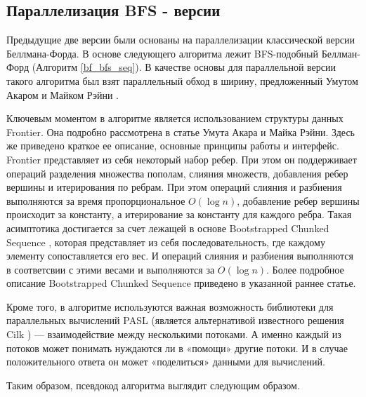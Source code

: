 \FloatBarrier
\subsection{Параллелизация BFS - версии}
Предыдущие две версии были основаны на параллелизации классической версии Беллмана-Форда. В основе следующего алгоритма лежит BFS-подобный Беллман-Форд (Алгоритм \ref{bf_bfs_seq}). В качестве основы для параллельной версии такого алгоритма был взят параллельный обход в ширину, предложенный Умутом Акаром и Майком Рэйни \cite{FRONTIERSEARCH}. 


Ключевым моментом в алгоритме является использованием структуры данных Frontier. Она подробно рассмотрена в статье Умута Акара и Майка Рэйни. Здесь же приведено краткое ее описание, основные принципы работы и интерфейс. Frontier представляет из себя некоторый набор ребер. При этом он поддерживает операций разделения множества пополам, слияния множеств, добавления ребер вершины и итерирования по ребрам. При этом  операций слияния и разбиения выполняются за время пропорциональное $O(\log n)$, добавление ребер вершины происходит за константу, а итерирование за константу для каждого ребра. Такая асимптотика достигается за счет лежащей в основе Bootstrapped Chunked Sequence \cite{CHUNKEDSEQ}, которая представляет из себя последовательность, где каждому элементу сопоставляется его вес. И операций слияния и разбиения выполняются в соответсвии с этими весами и выполняются за $O(\log n)$. Более подробное описание Bootstrapped Chunked Sequence приведено в указанной раннее статье. 

Кроме того, в алгоритме используются важная возможность библиотеки для параллельных вычислений PASL \cite{PASL} (является альтернативой известного решения Cilk \cite{CILK}) --- взаимодействие между несколькими потоками. А именно каждый из потоков может понимать нуждаются ли в «помощи» другие потоки. И в случае положительного ответа он может «поделиться» данными для вычислений. 

Таким образом, псевдокод алгоритма выглядит следующим образом.

